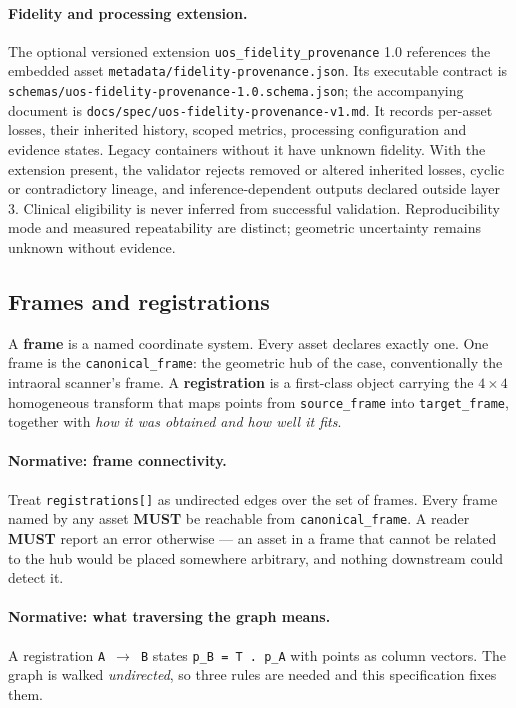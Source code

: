 \documentclass[11pt,a4paper]{article}
\newcommand{\MUST}{\textcolor{uosred}{\textbf{MUST}}}
\newcommand{\code}[1]{\texttt{\small #1}}
\begin{document}
\paragraph{Fidelity and processing extension.} The optional versioned extension
\code{uos\_fidelity\_provenance} 1.0 references the embedded asset
\code{metadata/fidelity-provenance.json}. Its executable contract is
\code{schemas/uos-fidelity-provenance-1.0.schema.json}; the accompanying document is
\code{docs/spec/uos-fidelity-provenance-v1.md}. It records per-asset losses, their
inherited history, scoped metrics, processing configuration and evidence states.
Legacy containers without it have unknown fidelity. With the extension present,
the validator rejects removed or altered inherited losses, cyclic or contradictory
lineage, and inference-dependent outputs declared outside layer 3. Clinical eligibility
is never inferred from successful validation. Reproducibility mode and measured
repeatability are distinct; geometric uncertainty remains unknown without evidence.

\subsection{Frames and registrations}\label{sec:frames}

A \textbf{frame} is a named coordinate system. Every asset declares exactly one. One frame
is the \code{canonical\_frame}: the geometric hub of the case, conventionally the intraoral
scanner's frame. A \textbf{registration} is a first-class object carrying the $4\times4$
homogeneous transform that maps points from \code{source\_frame} into \code{target\_frame},
together with \emph{how it was obtained and how well it fits}.

\paragraph{Normative: frame connectivity.} Treat \code{registrations[]} as undirected edges
over the set of frames. Every frame named by any asset \MUST{} be reachable from
\code{canonical\_frame}. A reader \MUST{} report an error otherwise --- an asset in a frame
that cannot be related to the hub would be placed somewhere arbitrary, and nothing
downstream could detect it.

\paragraph{Normative: what traversing the graph means.} A registration
\code{A}~$\to$~\code{B} states \code{p\_B = T . p\_A} with points as column vectors. The
graph is walked \emph{undirected}, so three rules are needed and this specification fixes
them.
\end{document}
